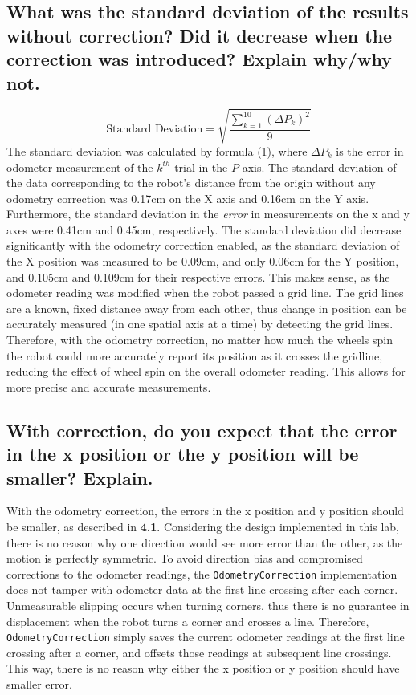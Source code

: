 \documentclass[11pt]{article} %
\begin{document}
\subsection{What was the standard deviation of the results without correction? Did it decrease when
the correction was introduced? Explain why/why not.}
\begin{equation}
	\mbox{Standard Deviation} = \sqrt { \frac{\sum_{k=1}^{10}(\Delta P_{k})^2}{9} }
\end{equation}
The standard deviation was calculated by formula (1), where $\Delta P_k$ is the error in odometer
measurement of the $k^{th}$ trial in the $P$ axis.
The standard deviation of the data corresponding to the robot's distance from the origin without any
odometry correction was 0.17cm on the X axis and 0.16cm on the Y axis. Furthermore, the standard
deviation in the \textit{error} in measurements on the x and y axes were 0.41cm and 0.45cm,
respectively. The standard deviation did
decrease significantly with the odometry correction enabled, as the standard deviation of the X
position was measured to be 0.09cm, and only 0.06cm for the Y position, and 0.105cm and 0.109cm for
their respective errors. This makes sense, as the
odometer reading was modified when the robot passed a grid line. The grid lines are a known, fixed
distance away from each other, thus change in position can be accurately measured (in one spatial
axis at a time) by detecting the grid lines. Therefore, with the odometry correction, no matter how
much the wheels spin the robot could more accurately report its position as it crosses the gridline,
reducing the effect of wheel spin on the overall odometer reading. This allows for more precise and
accurate measurements.
\subsection{With correction, do you expect that the error in the x position or the y position will
be smaller? Explain.}
With the odometry correction, the errors in the x position and y position should be smaller, as
described in \textbf{4.1}. Considering the design implemented in this lab, there is no reason why
one direction would see more error than the other, as the motion is perfectly symmetric. To avoid
direction bias and compromised corrections to the odometer readings, the \texttt{OdometryCorrection}
implementation does not tamper with odometer data at the first line crossing after each corner.
Unmeasurable slipping occurs when turning corners, thus there is no guarantee in displacement when
the robot turns a corner and crosses a line. Therefore, \texttt{OdometryCorrection} simply saves the
current odometer readings at the first line crossing after a corner, and offsets those readings at
subsequent line crossings. This way, there is no reason why either the x position or y position
should have smaller error.
\end{document}
